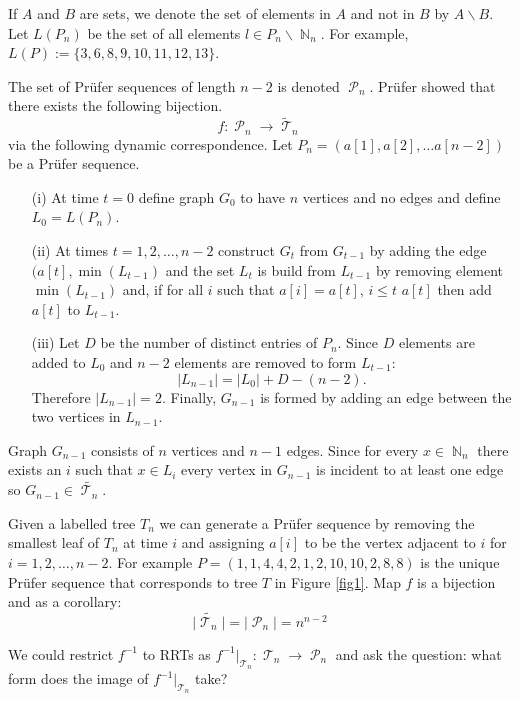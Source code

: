 \documentclass[oneside]{book} %
\theoremstyle{definition}
\numberwithin{equation}{section}
\DeclareMathOperator{\T}{\mathcal{T}}
\DeclareMathOperator{\N}{\mathbb{N}}
\DeclareMathOperator{\Pruf}{\mathcal{P}} %
\begin{document}
If $A$ and $B$ are sets, we denote the set of elements in $A$ and not in $B$ by $A \backslash B$. Let $L(P_n)$ be the set of all elements $l \in P_n \backslash \N_n$.  For example, $L(P) := \{3,6,8,9,10,11,12,13\}$.

The set of Pr\"{u}fer sequences of length $n-2$ is denoted $\Pruf_n$.  Pr\"{u}fer showed that there exists the following bijection. 
\[
  f: \Pruf_n \rightarrow\tilde{\T}_n 
\]
via the following dynamic correspondence.  Let $P_n = (a[1],a[2],\dots a[n-2])$ be a Pr\"{u}fer sequence.
\begin{itemize}
 \item[(i)] At time $t=0$ define graph $G_0$ to have $n$  vertices and no edges and  define $L_0 = L(P_n)$. 
 \item[(ii)] At times $t=1,2,\dots, n-2$ construct $G_t$ from $G_{t-1}$  by adding the edge $(a[t],\min(L_{t-1})$ and the set $L_t$
 is build from $L_{t-1}$ by removing element $\min(L_{t-1})$ and, if for all $i$ such that $a[i] = a[t]$, $i \leq t$ $a[t]$ then add $a[t]$ to $L_{t-1}$.
 \item[(iii)]Let $D$ be the number of distinct entries of $P_{n}$. Since $D$ elements are added to $L_{0}$ and $n-2$ elements are removed
to form $L_{t-1}$:
\[|L_{n-1}| = |L_{0}| + D - (n-2).\]
Therefore $|L_{n-1}| = 2$. Finally, $G_{n-1}$ is formed by adding an edge between the two vertices in $ 
L_{n-1}$.
\end{itemize}
Graph $G_{n-1}$ consists of $n$ vertices and $n-1$ edges.  Since for every $x \in \N_{n}$ there exists an $i$ such that $x \in L_i$ every vertex in $G_{n-1}$ is incident to at least one edge so $G_{n-1} \in \tilde{\T_n}$.  

Given a labelled tree $T_n$ we can generate a Pr\"{u}fer sequence by removing the smallest leaf of $T_n$ at time $i$ and assigning $a[i]$ to be the vertex adjacent to $i$ for $i = 1,2,\dots,n-2$. For example $P = (1,1,4,4,2,1,2,10,10,2,8,8)$ is the unique Pr\"{u}fer sequence that corresponds to tree $T$ in Figure \ref{fig1}. Map  $f$ is a bijection and as a corollary:
\[
 \lvert \tilde{\T_n} \rvert  = \lvert \Pruf_n \rvert  = n^{n-2} 
\]

We could restrict $f^{-1}$ to RRTs as $f^{-1} |_{\T_n}: \T_n \rightarrow \Pruf_n$ and ask the question: what form does the image of $f^{-1} |_{\T_n}$ take? 
\end{document}

